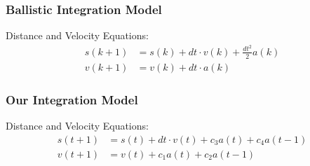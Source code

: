 \begin{frame}
  \frametitle{Ballistic Integration Model }

    Distance and Velocity Equations:
    \begin{align}
    s(k+1) &= s(k) + dt \cdot v(k) + \frac{dt^2}{2} a(k) \\
    v(k+1) &= v(k) + dt \cdot a(k)
    \end{align}

    \hfil
{}

\end{frame}




\begin{frame}
  \frametitle{Our Integration Model }

    Distance and Velocity Equations:
    \begin{align}
    s(t+1) &= s(t) + dt \cdot v(t)+ c_3 a(t) + c_4 a(t-1) \\
    v(t+1) &= v(t) + c_1 a(t) + c_2a(t-1)
    \end{align}

    \hfil
{}

\end{frame}

